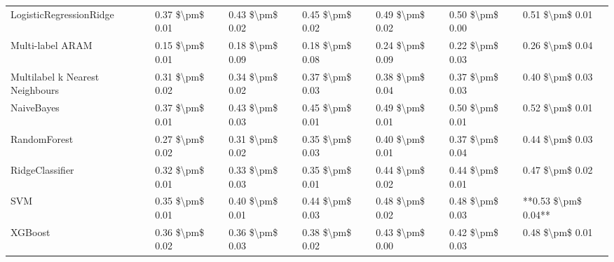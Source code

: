 \begin{tabular}{lllllll}
        LogisticRegressionRidge & 0.37 \$\textbackslash pm\$ 0.01 &           0.43 \$\textbackslash pm\$ 0.02 &       0.45 \$\textbackslash pm\$ 0.02 &        0.49 \$\textbackslash pm\$ 0.02 &                         0.50 \$\textbackslash pm\$ 0.00 &     0.51 \$\textbackslash pm\$ 0.01 \\
               Multi-label ARAM & 0.15 \$\textbackslash pm\$ 0.01 &           0.18 \$\textbackslash pm\$ 0.09 &       0.18 \$\textbackslash pm\$ 0.08 &        0.24 \$\textbackslash pm\$ 0.09 &                         0.22 \$\textbackslash pm\$ 0.03 &     0.26 \$\textbackslash pm\$ 0.04 \\
Multilabel k Nearest Neighbours & 0.31 \$\textbackslash pm\$ 0.02 &           0.34 \$\textbackslash pm\$ 0.02 &       0.37 \$\textbackslash pm\$ 0.03 &        0.38 \$\textbackslash pm\$ 0.04 &                         0.37 \$\textbackslash pm\$ 0.03 &     0.40 \$\textbackslash pm\$ 0.03 \\
                     NaiveBayes & 0.37 \$\textbackslash pm\$ 0.01 &           0.43 \$\textbackslash pm\$ 0.03 &       0.45 \$\textbackslash pm\$ 0.01 &        0.49 \$\textbackslash pm\$ 0.01 &                         0.50 \$\textbackslash pm\$ 0.01 &     0.52 \$\textbackslash pm\$ 0.01 \\
                   RandomForest & 0.27 \$\textbackslash pm\$ 0.02 &           0.31 \$\textbackslash pm\$ 0.02 &       0.35 \$\textbackslash pm\$ 0.03 &        0.40 \$\textbackslash pm\$ 0.01 &                         0.37 \$\textbackslash pm\$ 0.04 &     0.44 \$\textbackslash pm\$ 0.03 \\
                RidgeClassifier & 0.32 \$\textbackslash pm\$ 0.01 &           0.33 \$\textbackslash pm\$ 0.03 &       0.35 \$\textbackslash pm\$ 0.01 &        0.44 \$\textbackslash pm\$ 0.02 &                         0.44 \$\textbackslash pm\$ 0.01 &     0.47 \$\textbackslash pm\$ 0.02 \\
                            SVM & 0.35 \$\textbackslash pm\$ 0.01 &           0.40 \$\textbackslash pm\$ 0.01 &       0.44 \$\textbackslash pm\$ 0.03 &        0.48 \$\textbackslash pm\$ 0.02 &                         0.48 \$\textbackslash pm\$ 0.03 & **0.53 \$\textbackslash pm\$ 0.04** \\
                        XGBoost & 0.36 \$\textbackslash pm\$ 0.02 &           0.36 \$\textbackslash pm\$ 0.03 &       0.38 \$\textbackslash pm\$ 0.02 &        0.43 \$\textbackslash pm\$ 0.00 &                         0.42 \$\textbackslash pm\$ 0.03 &     0.48 \$\textbackslash pm\$ 0.01 \\
\bottomrule
\end{tabular}

